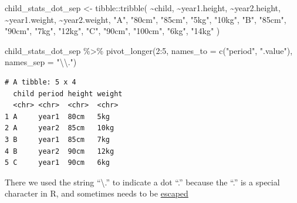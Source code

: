 \documentclass[
  letterpaper,
  DIV=11,
  numbers=noendperiod]{scrreprt}
\newenvironment{Shaded}{\begin{snugshade}}{\end{snugshade}}
\newcommand{\AttributeTok}[1]{\textcolor[rgb]{0.40,0.45,0.13}{#1}}
\newcommand{\DecValTok}[1]{\textcolor[rgb]{0.68,0.00,0.00}{#1}}
\newcommand{\FunctionTok}[1]{\textcolor[rgb]{0.28,0.35,0.67}{#1}}
\newcommand{\NormalTok}[1]{\textcolor[rgb]{0.00,0.23,0.31}{#1}}
\newcommand{\OtherTok}[1]{\textcolor[rgb]{0.00,0.23,0.31}{#1}}
\newcommand{\SpecialCharTok}[1]{\textcolor[rgb]{0.37,0.37,0.37}{#1}}
\newcommand{\StringTok}[1]{\textcolor[rgb]{0.13,0.47,0.30}{#1}}
\begin{document}
\begin{Shaded}
\begin{Highlighting}[]
\NormalTok{child\_stats\_dot\_sep }\OtherTok{\textless{}{-}} 
\NormalTok{  tibble}\SpecialCharTok{::}\FunctionTok{tribble}\NormalTok{(}
    \SpecialCharTok{\textasciitilde{}}\NormalTok{child, }\SpecialCharTok{\textasciitilde{}}\NormalTok{year1.height, }\SpecialCharTok{\textasciitilde{}}\NormalTok{year2.height, }\SpecialCharTok{\textasciitilde{}}\NormalTok{year1.weight, }\SpecialCharTok{\textasciitilde{}}\NormalTok{year2.weight,}
       \StringTok{"A"}\NormalTok{,        }\StringTok{"80cm"}\NormalTok{,        }\StringTok{"85cm"}\NormalTok{,         }\StringTok{"5kg"}\NormalTok{,        }\StringTok{"10kg"}\NormalTok{,}
       \StringTok{"B"}\NormalTok{,        }\StringTok{"85cm"}\NormalTok{,        }\StringTok{"90cm"}\NormalTok{,         }\StringTok{"7kg"}\NormalTok{,        }\StringTok{"12kg"}\NormalTok{,}
       \StringTok{"C"}\NormalTok{,        }\StringTok{"90cm"}\NormalTok{,       }\StringTok{"100cm"}\NormalTok{,         }\StringTok{"6kg"}\NormalTok{,        }\StringTok{"14kg"}
\NormalTok{    )}

\NormalTok{child\_stats\_dot\_sep }\SpecialCharTok{\%\textgreater{}\%} 
  \FunctionTok{pivot\_longer}\NormalTok{(}\DecValTok{2}\SpecialCharTok{:}\DecValTok{5}\NormalTok{, }
               \AttributeTok{names\_to =} \FunctionTok{c}\NormalTok{(}\StringTok{"period"}\NormalTok{, }\StringTok{".value"}\NormalTok{),}
               \AttributeTok{names\_sep =} \StringTok{"}\SpecialCharTok{\textbackslash{}\textbackslash{}}\StringTok{."}\NormalTok{)}
\end{Highlighting}
\end{Shaded}

\begin{verbatim}
# A tibble: 5 x 4
  child period height weight
  <chr> <chr>  <chr>  <chr> 
1 A     year1  80cm   5kg   
2 A     year2  85cm   10kg  
3 B     year1  85cm   7kg   
4 B     year2  90cm   12kg  
5 C     year1  90cm   6kg   
\end{verbatim}

There we used the string ``\textbackslash.'' to indicate a dot ``.''
because the ``.'' is a special character in R, and sometimes needs to be
\href{https://cran.r-project.org/web/packages/stringr/vignettes/regular-expressions.html\#escaping}{escaped}
\end{document}
